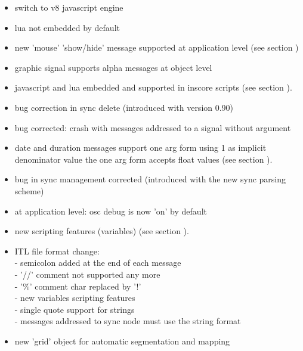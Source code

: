\begin{itemize}
\item switch to v8 javascript engine
\item lua not embedded by default
\end{itemize}

\begin{itemize}
\item new 'mouse' 'show/hide' message supported at application level (see section )
\item graphic signal supports alpha messages at object level
\item javascript and lua embedded and supported in inscore scripts  (see section ).
\item bug correction in sync delete (introduced with version 0.90)
\end{itemize}

\begin{itemize}
\item bug corrected: crash with messages addressed to a signal without argument
\item date and duration messages support one arg form using 1 as implicit denominator value 
  the one arg form accepts float values  (see section ).
\end{itemize}

\begin{itemize}
\item bug in sync management corrected (introduced with the new sync parsing scheme)
\end{itemize}

\begin{itemize}
\item at application level: osc debug is now 'on' by default
\item new scripting features (variables)  (see section ).
\item ITL file format change: \\
  - semicolon added at the end of each message \\
  - '//' comment not supported any more \\
  - '\%' comment char replaced by '!' \\
  - new variables scripting features \\
  - single quote support for strings \\
  - messages addressed to sync node must use the string format
\item new 'grid' object for automatic segmentation and mapping
\end{itemize}

